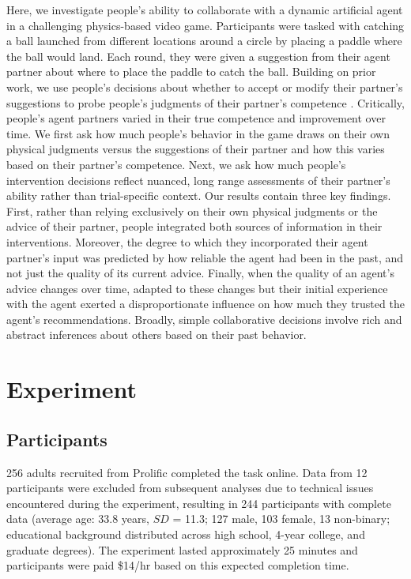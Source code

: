 \documentclass[10pt,letterpaper]{article}
\begin{document}
Here, we investigate people's ability to collaborate with a dynamic artificial agent in a challenging physics-based video game. Participants were tasked with catching a ball launched from different locations around a circle by placing a paddle where the ball would land. Each round, they were given a suggestion from their agent partner about where to place the paddle to catch the ball. Building on prior work, we use people's decisions about whether to accept or modify their partner's suggestions to probe people's judgments of their partner's competence \cite{xie2019robot, chen2020trust}. Critically, people's agent partners varied in their true competence and improvement over time. We first ask how much people's behavior in the game draws on their own physical judgments versus the suggestions of their partner and how this varies based on their partner's competence. Next, we ask how much people's intervention decisions reflect nuanced, long range assessments of their partner's ability rather than trial-specific context. Our results contain three key findings. First, rather than relying exclusively on their own physical judgments or the advice of their partner, people integrated both sources of information in their interventions. Moreover, the degree to which they incorporated their agent partner's input was predicted by how reliable the agent had been in the past, and not just the quality of its current advice. Finally, when the quality of an agent's advice changes over time, adapted to these changes but their initial experience with the agent exerted a disproportionate influence on how much they trusted the agent's recommendations. Broadly, simple collaborative decisions involve rich and abstract inferences about others based on their past behavior.
 



\section{Experiment}

\subsection{Participants}

256 adults recruited from Prolific completed the task online. Data from 12 participants were excluded from subsequent analyses due to technical issues encountered during the experiment, resulting in 244 participants with complete data (average age: 33.8 years, $SD$ = 11.3; 127 male, 103 female, 13 non-binary; educational background distributed across high school, 4-year college, and graduate degrees). The experiment lasted approximately 25 minutes and participants were paid \$14/hr based on this expected completion time. 
\end{document}

